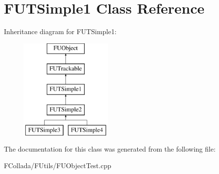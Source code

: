 \hypertarget{classFUTSimple1}{
\section{FUTSimple1 Class Reference}
\label{classFUTSimple1}
}
Inheritance diagram for FUTSimple1:\begin{figure}[H]
\begin{center}
\leavevmode
\includegraphics[height=5.000000cm]{classFUTSimple1}
\end{center}
\end{figure}


The documentation for this class was generated from the following file:\begin{DoxyCompactItemize}
\item 
FCollada/FUtils/FUObjectTest.cpp\end{DoxyCompactItemize}

